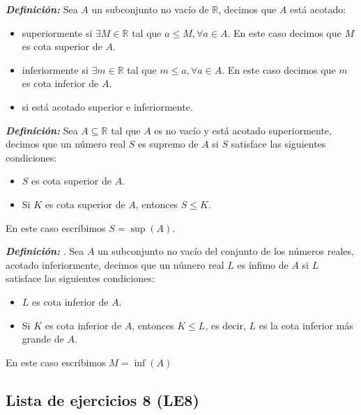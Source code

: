 \documentclass[11pt]{article}
\newcommand{\R}{\mathbb{R}}
\newcommand{\bfit}[1]{\textbf{\textit{#1}}}
\let\subset\subseteq
\begin{document}
\bfit{Definición:}  Sea $A$ un subconjunto no vacío de $\R$, decimos que $A$ está acotado:
\begin{itemize}
    \item superiormente si $\exists M\in \R$ tal que $a \leq M, \forall a\in A$. En este caso decimos que $M$ es cota superior de $A$.

    \item inferiormente si $\exists m\in \R$ tal que $m \leq a, \forall a\in A$. En este caso decimos que $m$ es cota inferior de $A$.

    \item si está acotado superior e inferiormente.
\end{itemize}

\bfit{Definición:}  Sea $A\subset \R$ tal que $A$ es no vacío y está acotado superiormente, decimos que un número real $S$ es supremo de $A$ si $S$ satisface las siguientes condiciones:
\begin{itemize}
    \item $S$ es cota superior de $A$.
    \item Si $K$ es cota superior de $A$, entonces $S\leq K$.%
\end{itemize}

En este caso escribimos $S=\sup(A)$.

\bfit{Definición:} . Sea $A$ un subconjunto no vacío del conjunto de los números reales, acotado inferiormente, decimos que un número real $L$ es ínfimo de $A$ si $L$ satisface las siguientes condiciones: \begin{itemize}
    \item $L$ es cota inferior de $A$.
    \item Si $K$ es cota inferior de $A$, entonces $K\leq L$, es decir, $L$ es la cota inferior más grande de $A$.
\end{itemize}

En este caso escribimos $M=\inf(A)$

\subsection*{Lista de ejercicios 8 (LE8)}
\end{document}
